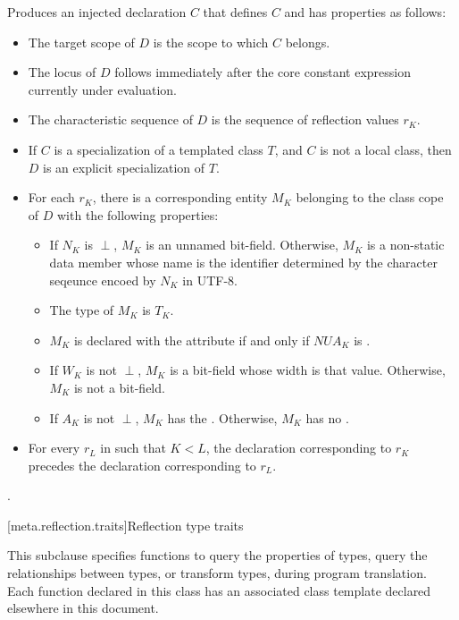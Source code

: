 \begin{itemdescr}
\pnum
\effects
Produces an injected declaration $C$
that defines $C$ and has properties as follows:
\begin{itemize}
\item
  The target scope of $D$
  is the scope to which $C$ belongs.
\item
  The locus of $D$
  follows immediately after the core constant expression
  currently under evaluation.
\item
  The characteristic sequence of $D$
  is the sequence of reflection values $r_K$.
\item
  If $C$ is a specialization of a templated class $T$,
  and $C$ is not a local class,
  then $D$ is an explicit specialization of $T$.
\item
  For each $r_K$,
  there is a corresponding entity $M_K$
  belonging to the class cope of $D$
  with the following properties:
  \begin{itemize}
  \item
    If $N_K$ is $\perp$,
    $M_K$ is an unnamed bit-field.
    Otherwise, $M_K$ is a non-static data member whose name is the identifier
    determined by the character seqeunce encoed by $N_K$ in UTF-8.
  \item
    The type of $M_K$ is $T_K$.
  \item
    $M_K$ is declared with the attribute 
    if and only if $\mathit{NUA}_K$ is .
  \item
    If $W_K$ is not $\perp$,
    $M_K$ is a bit-field whose width is that value.
    Otherwise, $M_K$ is not a bit-field.
  \item
    If $A_K$ is not $\perp$,
    $M_K$ has the  .
    Otherwise, $M_K$ has no .
  \end{itemize}
  \item
    For every $r_L$ in  such that $K < L$,
    the declaration corresponding to $r_K$
    precedes the declaration corresponding to $r_L$.
\end{itemize}

\pnum
\returns
{}.
\end{itemdescr}

[meta.reflection.traits]{Reflection type traits}

\pnum
This subclause specifies  functions to
query the properties of types,
query the relationships between types, or
transform types,
during program translation.
Each  function declared in this class
has an associated class template declared elsewhere in this document.

